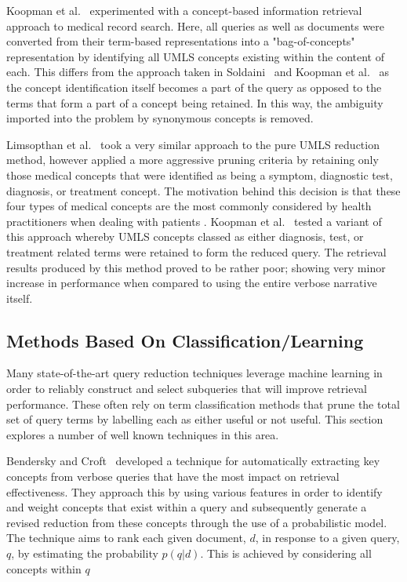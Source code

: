 \documentclass[a4paper]{report}
\begin{document}
Koopman et al.~\cite{Koopman2011AEHRC--QUT-at-T} experimented with a concept-based information retrieval approach to medical record search. Here, all queries as well as documents were converted from their term-based representations into a "bag-of-concepts" representation by identifying all UMLS concepts existing within the content of each. This differs from the approach taken in Soldaini~\citep{Soldaini2015RetrievingML} and Koopman et al.~\citep{koopman2017generating} as the concept identification itself becomes a part of the query as opposed to the terms that form a part of a concept being retained. In this way, the ambiguity imported into the problem by synonymous concepts is removed. 

Limsopthan et al.~\citep{Limsopatham2013A-Task-Specific} took a very similar approach to the pure UMLS reduction method, however applied a more aggressive pruning criteria by retaining only those medical concepts that were identified as being a symptom, diagnostic test, diagnosis, or treatment concept. The motivation behind this decision is that these four types of medical concepts are the most commonly considered by health practitioners when dealing with patients \cite{Ely429}. Koopman et al.~\citep{koopman2017generating} tested a variant of this approach whereby UMLS concepts classed as either diagnosis, test, or treatment related terms were retained to form the reduced query. The retrieval results produced by this method proved to be rather poor; showing very minor increase in performance when compared to using the entire verbose narrative itself.


\subsection{Methods Based On Classification/Learning}

Many state-of-the-art query reduction techniques leverage machine learning in order to reliably construct and select subqueries that will improve retrieval performance. These often rely on term classification methods that prune the total set of query terms by labelling each as either useful or not useful. This section explores a number of well known techniques in this area.
  
Bendersky and Croft~\cite{Bendersky:2008:DKC:1390334.1390419} developed a technique for automatically extracting key concepts from verbose queries that have the most impact on retrieval effectiveness. They approach this by using various features in order to identify and weight concepts that exist within a query and subsequently generate a revised reduction from these concepts through the use of a probabilistic model. The technique aims to rank each given document, $d$, in response to a given query, $q$, by estimating the probability $p(q|d)$. This is achieved by considering all concepts within $q$
\end{document}
